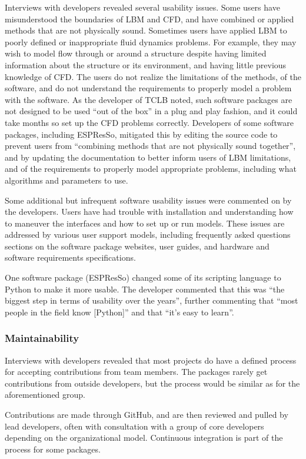 \documentclass[12pt, notitlepage]{article}
\begin{document}
Interviews with developers revealed several usability issues. Some users have misunderstood the boundaries of LBM and CFD, and have combined or applied methods that are not physically sound. Sometimes users have applied LBM to poorly defined or inappropriate fluid dynamics problems. For example, they may wish to model flow through or around a structure despite having limited information about the structure or its environment, and having little previous knowledge of CFD. The users do not realize the limitations of the methods, of the software, and do not understand the requirements to properly model a problem with the software. As the developer of TCLB noted, such software packages are not designed to be used ``out of the box'' in a plug and play fashion, and it could take months so set up the CFD problems correctly. Developers of some software packages, including ESPResSo, mitigated this by editing the source code to prevent users from ``combining methods that are not physically sound together'', and by updating the documentation to better inform users of LBM limitations, and of the requirements to properly model appropriate problems, including what algorithms and parameters to use. 

Some additional but infrequent software usability issues were commented on by the developers. Users have had trouble with installation and understanding how to maneuver the interfaces and how to set up or run models. These issues are addressed by various user support models, including frequently asked questions sections on the software package websites, user guides, and hardware and software requirements specifications.

One software package (ESPResSo) changed some of its scripting language to Python to make it more usable. The developer commented that this was ``the biggest step in terms of usability over the years'', further commenting that ``most people in the field know [Python]'' and that ``it's easy to learn''. 

\subsubsection{Maintainability}

Interviews with developers revealed that most projects do have a defined process for accepting contributions from team members. The packages rarely get contributions from outside developers, but the process would be similar as for the aforementioned group.

Contributions are made through GitHub, and are then reviewed and pulled by lead developers, often with consultation with a group of core developers depending on the organizational model. Continuous integration is part of the process for some packages. 
\end{document}
